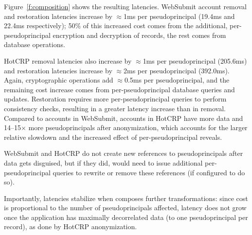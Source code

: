 %
Figure~\ref{f:composition} shows the resulting latencies.
%
WebSubmit account removal and restoration latencies increase by $\approx$1ms per
pseudoprincipal (19.4ms and 22.4ms respectively); 50\% of this increased cost
comes from the additional, per-pseudoprincipal encryption and decryption of
records, the rest comes from database operations.

%
HotCRP removal latencies also increase by $\approx$1ms per pseudoprincipal
(205.6ms) and restoration latencies increase by $\approx$2ms per pseudoprincipal
(392.0ms). Again, cryptographic operations add $\approx$0.5ms per
pseudoprincipal, and the remaining cost increase comes from per-pseudoprincipal
database queries and updates. Restoration requires more per-pseudoprincipal
queries to \eg perform consistency checks, resulting in a greater latency
increase than in removal. 
%
Compared to accounts in WebSubmit, accounts in HotCRP have more data and
14--15$\times$ more pseudoprincipals after anonymization, which accounts for the
larger relative slowdown and the increased effect of per-pseudoprincipal
reveals.

WebSubmit and HotCRP do not create new references to pseudoprincipals after data
gets disguised, but if they did, \sys would need to issue additional
per-pseudoprincipal queries to rewrite or remove these references (if configured
to do so).
%
%
%
%
%

%
Importantly, \xxing latencies stabilize when \sys composes further \xxing
transformations: since cost is proportional to the number of pseudoprincipals
affected, latency does not grow once the application has maximally decorrelated
data (to one pseudoprincipal per record), as done by HotCRP anonymization.
%



